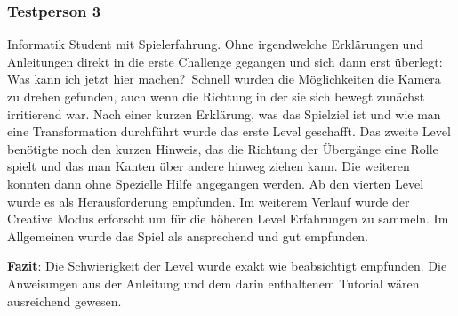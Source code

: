 \subsubsection*{Testperson 3}

Informatik Student mit Spielerfahrung. Ohne irgendwelche Erklärungen und Anleitungen direkt in die erste Challenge gegangen und sich dann erst überlegt: \glqq Was kann ich jetzt hier machen?\grqq~Schnell wurden die Möglichkeiten die Kamera zu drehen gefunden, auch wenn die Richtung in der sie sich bewegt zunächst irritierend war. Nach einer kurzen Erklärung, was das Spielziel ist und wie man eine Transformation durchführt wurde das erste Level geschafft. Das zweite Level benötigte noch den kurzen Hinweis, das die Richtung der Übergänge eine Rolle spielt und das man Kanten über andere hinweg ziehen kann. Die weiteren konnten dann ohne Spezielle Hilfe angegangen werden. Ab den vierten Level wurde es als Herausforderung empfunden. Im weiterem Verlauf wurde der Creative Modus erforscht um für die höheren Level Erfahrungen zu sammeln. Im Allgemeinen wurde das Spiel als ansprechend und gut empfunden.

{\bf Fazit}: Die Schwierigkeit der Level wurde exakt wie beabsichtigt empfunden. Die Anweisungen aus der Anleitung und dem darin enthaltenem Tutorial wären ausreichend gewesen.




